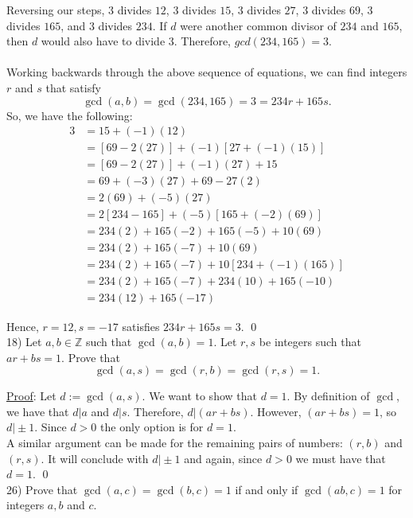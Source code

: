 \documentclass{article}
\begin{document}
Reversing our steps, $3$ divides $12$, $3$ divides $15$, $3$ divides $27$, $3$ divides $69$, $3$ divides $165$, and $3$ divides $234.$  If $d$ were another common divisor of $234$ and $165$, then $d$ would also have to divide $3$. Therefore, $gcd(234, 165) = 3.$\\\\
Working backwards through the above sequence of equations, we can  find integers $r$ and $s$ that satisfy
$$\gcd(a,b) = \gcd(234, 165) = 3 = 234r + 165s.$$ So, we have the following:
\begin{align*}
	3 &= 15 + (-1) (12) \\
	&= [69 - 2(27)] + (-1)[27 + (-1)(15)] \\
	&= [69 - 2(27)] + (-1)(27) + 15 \\
	&= 69 + (-3)(27) + 69 - 27(2) \\
	&= 2(69) + (-5)(27) \\
	&= 2[234 - 165] + (-5)[165 + (-2)(69)] \\
	&= 234(2) + 165(-2) + 165(-5) + 10(69) \\
	&= 234(2) + 165(-7) + 10(69) \\
	&= 234(2) + 165(-7) + 10[234 + (-1)(165)] \\
	&= 234(2) + 165(-7) + 234(10) + 165(-10) \\
	&= 234(12) + 165(-17)
\end{align*}

Hence, $r = 12, s = -17$ satisfies $234r + 165s = 3.$ \qed \\

18) Let $a, b \in \mathbb{Z}$ such that $\gcd(a, b) = 1$. Let $r, s$ be integers such that $ar + bs = 1$. Prove that 
$$\gcd(a, s) = \gcd(r, b) = \gcd(r, s) = 1.$$

\underline{Proof}: Let $d := \gcd(a, s).$ We want to show that $d = 1.$ By definition of $\gcd$, we have that $d \vert a$ and $d \vert s$. Therefore, $d \vert (ar + bs).$ However, $(ar + bs) = 1$, so $d \vert \pm 1$. Since $d > 0$ the only option is for $d = 1.$ \\

A similar argument can be made for the remaining pairs of numbers: $(r, b)$ and $(r, s)$. It will conclude with $d \vert \pm1$ and again, since $d > 0$ we must have that $d = 1$. \qed \\

26) Prove that $\gcd(a, c) = \gcd(b, c) = 1$ if and only if $\gcd(ab, c) = 1$ for integers $a, b$ and $c.$ \\
\end{document}
